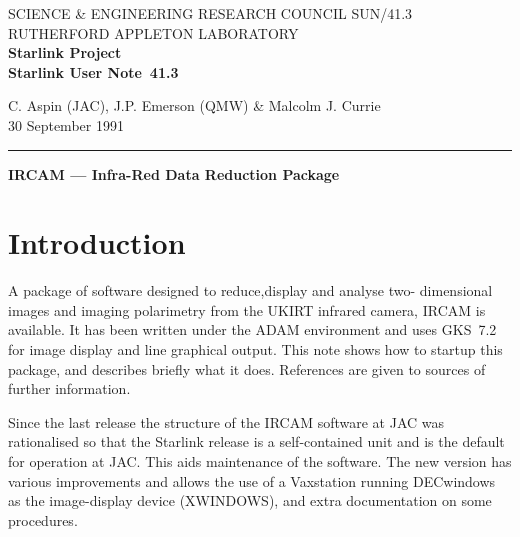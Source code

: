 \pagestyle{myheadings}

\newcommand{\stardoccategory}  {Starlink User Note}
\newcommand{\stardocinitials}  {SUN}
\newcommand{\stardocnumber}    {41.3}
\newcommand{\stardocauthors}   {C. Aspin (JAC), J.P. Emerson (QMW) \&
                               Malcolm J. Currie}
\newcommand{\stardocdate}      {30 September 1991}
\newcommand{\stardoctitle}     {IRCAM --- Infra-Red Data Reduction Package}

\newcommand{\stardocname}{\stardocinitials /\stardocnumber}
\markright{\stardocname}
\setlength{\textwidth}{160mm}
\setlength{\textheight}{230mm}
\setlength{\topmargin}{-2mm}
\setlength{\oddsidemargin}{0mm}
\setlength{\evensidemargin}{0mm}
\setlength{\parindent}{0mm}
\setlength{\parskip}{\medskipamount}
\setlength{\unitlength}{1mm}


\thispagestyle{empty}
SCIENCE \& ENGINEERING RESEARCH COUNCIL \hfill \stardocname\\
RUTHERFORD APPLETON LABORATORY\\
{\large\bf Starlink Project\\}
{\large\bf \stardoccategory\ \stardocnumber}
\begin{flushright}
\stardocauthors\\
\stardocdate
\end{flushright}
\vspace{-4mm}
\rule{\textwidth}{0.5mm}
\vspace{5mm}
\begin{center}
{\Large\bf \stardoctitle}
\end{center}
\vspace{5mm}

\section {Introduction}

A package of software designed to reduce,display and analyse two-
dimensional images and imaging polarimetry from the UKIRT infrared
camera, IRCAM is available. It has been written under the ADAM
environment and uses GKS~7.2 for image display and line graphical
output. This note shows how to startup this package, and describes
briefly what it does. References are given to sources of further
information. 

Since the last release the structure of the IRCAM software at JAC was
rationalised so that the Starlink release is a self-contained unit and
is the default for operation at JAC. This aids maintenance of the
software. The new version has various improvements and allows the use of
a Vaxstation running DECwindows as the image-display device (XWINDOWS),
and extra documentation on some procedures. 


